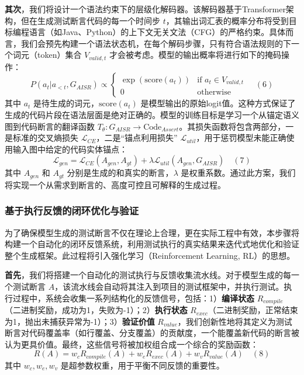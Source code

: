 \documentclass[12pt]{article}
\begin{document}
\textbf{其次}，我们将设计一个语法约束下的层级化解码器。该解码器基于Transformer架构，但在生成测试断言代码的每一个时间步 $t$，其输出词汇表的概率分布将受到目标编程语言（如Java、Python）的上下文无关文法（CFG）的严格约束。具体而言，我们会预先构建一个语法状态机，在每个解码步骤，只有符合语法规则的下一个词元（token）集合 $V_{valid,t}$ 才会被考虑。模型的输出概率将进行如下的掩码操作：
$$
P(a_t | a_{<t}, G_{AISR}) \propto \begin{cases} \exp(\text{score}(a_t)) & \text{if } a_t \in V_{valid,t} \\ 0 & \text{otherwise} \end{cases} \quad (6)
$$
其中 $a_t$ 是待生成的词元，$\text{score}(a_t)$ 是模型输出的原始logit值。这种方式保证了生成的代码片段在语法层面是绝对正确的。模型的训练目标是学习一个从锚定语义图到代码断言的翻译函数 $T_{\theta}: G_{AISR} \rightarrow \text{Code}_{Assert}$。其损失函数将包含两部分，一是标准的交叉熵损失 $\mathcal{L}_{CE}$，二是“锚点利用损失” $\mathcal{L}_{util}$，用于惩罚模型未能正确使用输入图中给定的代码实体锚点：
$$
\mathcal{L}_{gen} = \mathcal{L}_{CE}(A_{gen}, A_{gt}) + \lambda \mathcal{L}_{util}(A_{gen}, G_{AISR}) \quad (7)
$$
其中 $A_{gen}$ 和 $A_{gt}$ 分别是生成的和真实的断言，$ \lambda $ 是权重系数。通过此方案，我们将实现一个从需求到断言的、高度可控且可解释的生成过程。

\subsubsection{基于执行反馈的闭环优化与验证}

为了确保模型生成的测试断言不仅在理论上合理，更在实际工程中有效，本步骤将构建一个自动化的闭环反馈系统，利用测试执行的真实结果来迭代式地优化和验证整个生成框架。此过程将引入强化学习（Reinforcement Learning, RL）的思想。

\textbf{首先}，我们将搭建一个自动化的测试执行与反馈收集流水线。对于模型生成的每一个测试断言 $A$，该流水线会自动将其注入到项目的测试框架中，并执行测试。执行过程中，系统会收集一系列结构化的反馈信号，包括：1）\textbf{编译状态} $R_{compile}$（二进制奖励，成功为1，失败为-1）；2）\textbf{执行状态} $R_{exec}$（二进制奖励，正常结束为1，抛出未捕获异常为-1）；3）\textbf{验证价值} $R_{value}$，我们创新性地将其定义为测试断言对代码覆盖率（如行覆盖、分支覆盖）的贡献度，一个能覆盖新代码的断言被认为更具价值。最终，这些信号将被加权组合成一个综合的奖励函数：
$$
R(A) = w_c R_{compile}(A) + w_e R_{exec}(A) + w_v R_{value}(A) \quad (8)
$$
其中 $w_c, w_e, w_v$ 是超参数权重，用于平衡不同反馈的重要性。
\end{document}
